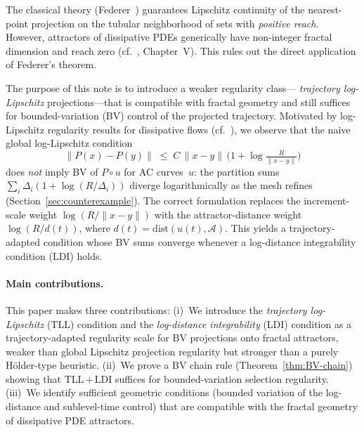 \documentclass[12pt,a4paper]{article}
\theoremstyle{definition}
\theoremstyle{plain}
\theoremstyle{remark}
\newcommand{\dist}{\mathrm{dist}}
\begin{document}
The classical theory (Federer~\cite{Federer1959}) guarantees Lipschitz
continuity of the nearest-point projection on the tubular neighborhood
of sets with \emph{positive reach}.  However, attractors of dissipative
PDEs generically have non-integer fractal dimension and reach zero
(cf.~\cite{Temam1997}, Chapter~V).  This rules out the direct
application of Federer's theorem.

The purpose of this note is to introduce a weaker regularity class---
\emph{trajectory log-Lipschitz} projections---that is compatible with
fractal geometry and still suffices for bounded-variation (BV) control
of the projected trajectory.  Motivated by log-Lipschitz regularity
results for dissipative flows
(cf.~\cite{BaeCannone2016}), we observe that the naive
global log-Lipschitz condition
\begin{equation}\label{eq:global-LL-intro}
  \|P(x) - P(y)\|
  \;\le\;
  C\,\|x-y\|\,\bigl(1 + \log\tfrac{R}{\|x-y\|}\bigr)
\end{equation}
does \emph{not} imply BV of $P \circ u$ for AC curves~$u$: the
partition sums $\sum_i \Delta_i(1+\log(R/\Delta_i))$ diverge
logarithmically as the mesh refines (Section~\ref{sec:counterexample}).
The correct formulation replaces the increment-scale weight
$\log(R/\|x-y\|)$ with the attractor-distance weight
$\log(R/d(t))$, where $d(t) = \dist(u(t),\mathcal{A})$.  This
yields a trajectory-adapted condition whose BV sums converge
whenever a log-distance integrability condition (LDI) holds.


\paragraph{Main contributions.}
This paper makes three contributions: (i)~We introduce the \emph{trajectory log-Lipschitz} (TLL) condition and the \emph{log-distance integrability} (LDI) condition as a trajectory-adapted regularity scale for BV projections onto fractal attractors, weaker than global Lipschitz projection regularity but stronger than a purely Hölder-type heuristic. (ii)~We prove a BV chain rule (Theorem~\ref{thm:BV-chain}) showing that TLL\,+\,LDI suffices for bounded-variation selection regularity. (iii)~We identify sufficient geometric conditions (bounded variation of the log-distance and sublevel-time control) that are compatible with the fractal geometry of dissipative PDE attractors.
\end{document}
